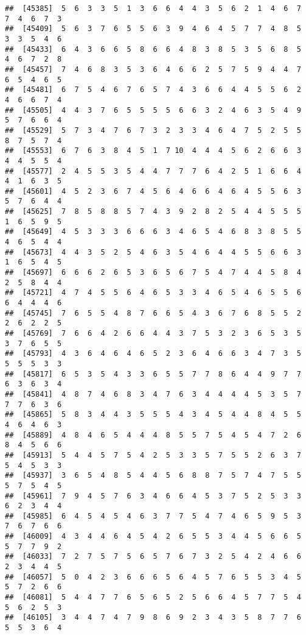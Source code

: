 \documentclass[
]{book}
\begin{document}
\begin{verbatim}
##  [45385]  5  6  3  3  5  1  3  6  6  4  4  3  5  6  2  1  4  6  7  7  4  6  7  3
##  [45409]  5  6  3  7  6  5  5  6  3  9  4  6  4  5  7  7  4  8  5  3  3  5  4  6
##  [45433]  6  4  3  6  6  5  8  6  6  4  8  3  8  5  3  5  6  8  5  4  6  7  2  8
##  [45457]  7  4  6  8  3  5  3  6  4  6  6  2  5  7  5  9  4  4  7  6  5  4  6  5
##  [45481]  6  7  5  4  6  7  6  5  7  4  3  6  6  4  4  5  5  6  2  4  6  6  7  4
##  [45505]  4  4  3  7  6  5  5  5  5  6  6  3  2  4  6  3  5  4  9  5  7  6  6  4
##  [45529]  5  7  3  4  7  6  7  3  2  3  3  4  6  4  7  5  2  5  5  8  7  5  7  4
##  [45553]  6  7  6  3  8  4  5  1  7 10  4  4  4  5  6  2  6  6  3  4  4  5  5  4
##  [45577]  2  4  5  5  3  5  4  4  7  7  7  6  4  2  5  1  6  6  4  4  1  6  3  5
##  [45601]  4  5  2  3  6  7  4  5  6  4  6  6  4  6  4  5  5  6  3  5  7  6  4  4
##  [45625]  7  8  5  8  8  5  7  4  3  9  2  8  2  5  4  4  5  5  5  1  6  5  9  5
##  [45649]  4  5  3  3  3  6  6  6  3  4  6  5  4  6  8  3  8  5  5  4  6  5  4  4
##  [45673]  4  4  3  5  2  5  4  6  3  5  4  6  4  4  5  5  6  6  3  1  6  5  4  5
##  [45697]  6  6  6  2  6  5  3  6  5  6  7  5  4  7  4  4  5  8  4  2  5  8  4  4
##  [45721]  4  7  4  5  5  6  4  6  5  3  3  4  6  5  4  6  5  5  6  6  4  4  4  6
##  [45745]  7  6  5  5  4  8  7  6  6  5  4  3  6  7  6  8  5  5  2  2  6  2  2  5
##  [45769]  7  6  6  4  2  6  6  4  4  3  7  5  3  2  3  6  5  3  5  3  7  6  5  5
##  [45793]  4  3  6  4  6  4  6  5  2  3  6  4  6  6  3  4  7  3  5  5  5  5  3  3
##  [45817]  6  5  3  5  4  3  3  6  5  5  7  7  8  6  4  4  9  7  7  6  3  6  3  4
##  [45841]  4  8  7  4  6  8  3  4  7  6  3  4  4  4  4  5  3  5  7  7  7  6  3  6
##  [45865]  5  8  3  4  4  3  5  5  5  4  3  4  5  4  4  8  4  5  5  4  6  4  6  3
##  [45889]  4  8  4  6  5  4  4  4  8  5  5  7  5  4  5  4  7  2  6  8  4  5  6  6
##  [45913]  5  4  4  5  7  5  4  2  5  3  3  5  7  5  5  2  6  3  7  5  4  5  3  3
##  [45937]  3  6  5  4  8  5  4  4  5  6  8  8  7  5  7  4  7  5  5  5  7  5  4  5
##  [45961]  7  9  4  5  7  6  3  4  6  6  4  5  3  7  5  2  5  3  3  6  2  3  4  4
##  [45985]  6  4  5  4  5  4  6  3  7  7  5  4  7  4  6  5  9  5  3  7  6  7  6  6
##  [46009]  4  3  4  4  6  4  5  4  2  6  5  5  3  4  4  5  6  6  5  5  7  7  9  2
##  [46033]  7  2  7  5  7  5  6  5  7  6  7  3  2  5  4  2  4  6  6  2  3  4  4  5
##  [46057]  5  0  4  2  3  6  6  6  5  6  4  5  7  6  5  5  3  4  5  5  7  2  6  6
##  [46081]  5  4  4  7  7  6  5  6  5  2  5  6  6  4  5  7  7  5  4  5  6  2  5  3
##  [46105]  3  4  4  7  4  7  9  8  6  9  2  3  4  3  5  8  7  7  6  5  5  3  6  4

\end{verbatim}
\end{document}

